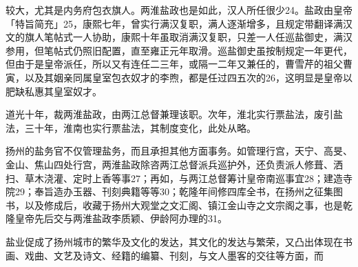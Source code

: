 \vfill
\begin{BookNotes}
\end{BookNotes}

\noindent 较大，尤其是内务府包衣旗人。两淮盐政也是如此，汉人所任很少24。盐政由皇帝「特旨简充」25，康熙七年，曾实行满汉复职，满人逐渐增多，且规定带翻译满汉文的旗人笔帖式一人协助，康熙十年虽取消满汉复职，只差一人任巡盐御史，满汉参用，但笔帖式仍照旧配置，直至雍正元年取滑。巡盐御史虽按制规定一年更代，但由于是皇帝派任，所以又有连任二三年，或隔一二年又兼任的，曹雪芹的祖父曹寅，以及其姻亲同属皇室包衣奴才的李煦，都是任过四五次的26，这明显是皇帝以肥缺私惠其皇室奴才。

道光十年，裁两淮盐政，由两江总督兼理该职。次年，淮北实行票盐法，废引盐法，三十年，淮南也实行票盐法，其制度变化，此处从略。


扬州的盐务官不仅管理盐务，而且承担其他方面事务。如管理行宫，天宁、高旻、金山、焦山四处行宫，两淮盐政除咨两江总督派兵巡护外，还负责派人修葺、洒扫、草木浇灌、定时上香等事27；再如，与两江总督筹计皇帝南巡事宜28；建造寺院29；奉旨造办玉器、刊刻典籍等等30；乾隆年间修四库全书，在扬州之征集图书，以及修成后，收藏于扬州大观堂之文汇阁、镇江金山寺之文宗阁之事，也是乾隆皇帝先后交与两淮盐政李质颖、伊龄阿办理的31。

盐业促成了扬州城市的繁华及文化的发达，其文化的发达与繁荣，又凸出体现在书画、戏曲、文艺及诗文、经籍的编纂、刊刻，与文人墨客的交往等方面，而

\vfill
\begin{BookNotes}
\end{BookNotes}

